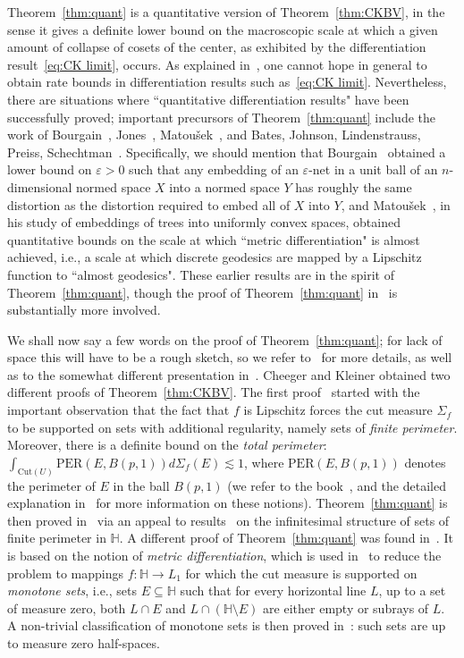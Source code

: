 \documentclass{icm2010}
\theoremstyle{definition}
\newcommand{\1}{\mathbf{1}}
\renewcommand{\H}{\mathbb{H}}
\newcommand{\e}{\varepsilon}
\newcommand{\Cut}{\mathrm{Cut}}
\begin{document}
Theorem~\ref{thm:quant} is a quantitative version of
Theorem~\ref{thm:CKBV}, in the sense it gives a definite lower bound
on the macroscopic scale at which a given amount of collapse of
cosets of the center, as exhibited by the differentiation
result~\eqref{eq:CK limit}, occurs. As explained in~\cite[Rem.\
2.1]{ckn}, one cannot hope in general to obtain rate bounds in differentiation results such as~\eqref{eq:CK limit}. Nevertheless,
there are situations where ``quantitative differentiation results"
have been successfully proved; important precursors of Theorem~\ref{thm:quant}
include the work of Bourgain~\cite{Bou87}, Jones~\cite{jones88},
Matou\v{s}ek~\cite{Mat99}, and Bates, Johnson, Lindenstrauss,
Preiss, Schechtman~\cite{BJLPS99}. Specifically, we should mention
that Bourgain~\cite{Bou87} obtained a lower bound on $\e>0$ such
that any embedding of an $\e$-net in a unit ball of an
$n$-dimensional normed space $X$ into a  normed space $Y$ has
roughly the same distortion as the distortion required to embed all
of $X$ into $Y$, and Matou\v{s}ek~\cite{Mat99}, in his study of
embeddings of trees into uniformly convex spaces, obtained
quantitative bounds on the scale at which ``metric differentiation"
is almost achieved, i.e., a scale at which discrete geodesics are
mapped by a Lipschitz function to ``almost geodesics". These earlier
results are in the spirit  of Theorem~\ref{thm:quant},
though the proof of Theorem~\ref{thm:quant} in~\cite{ckn} is
substantially more involved.

We shall now say a few words on the proof of
Theorem~\ref{thm:quant}; for lack of space this will have to be a
rough sketch, so we refer to~\cite{ckn} for more details, as well as
to the somewhat different presentation in~\cite{CKN09}. Cheeger and
Kleiner obtained two different proofs of Theorem~\ref{thm:CKBV}. The
first proof~\cite{ckbv} started with the important observation that
the fact that $f$ is Lipschitz forces the cut measure $\Sigma_f$ to
be supported on sets with additional regularity, namely sets of {\em
finite perimeter}. Moreover, there is a definite bound on the {\em
total perimeter}: $\int_{\Cut(U)}
\mathrm{PER}(E,B(p,1))d\Sigma_f(E)\lesssim 1$, where
$\mathrm{PER}(E,B(p,1))$ denotes the perimeter of $E$ in the ball
$B(p,1)$ (we refer to the book~\cite{luigetal}, and the detailed
explanation in~\cite{ckbv,ckn} for more information on these
notions). Theorem~\ref{thm:quant} is then proved in~\cite{ckbv} via
an appeal to results~\cite{italians1,italians2} on the infinitesimal
structure of sets of finite perimeter in $\H$. A different proof of
Theorem~\ref{thm:quant} was found in~\cite{ckmetmon}. It is based on
the notion of  {\em metric differentiation}, which is used
in~\cite{ckmetmon} to reduce the problem to mappings $f:\H\to L_1$
for which the cut measure is supported on {\em monotone sets}, i.e.,
sets $E\subseteq \H$ such that for every horizontal line $L$, up to
a set of measure zero, both $L\cap E$ and $L\cap (\H\setminus E)$
are either empty or subrays of $L$. A non-trivial classification of
monotone sets is then proved in~\cite{ckmetmon}: such sets are up to
measure zero half-spaces.
\end{document}
